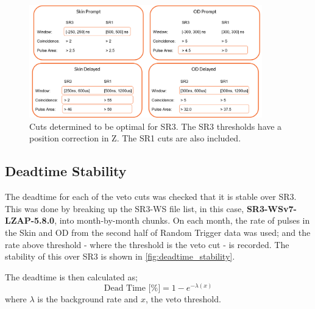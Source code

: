 \begin{figure}
    \centering
    \includegraphics[width=0.9\textwidth]{figures/VetoEfficiency/sr3_cuts.png}
    \caption{Cuts determined to be optimal for SR3. 
    The SR3 thresholds have a position correction in Z. The SR1 cuts are also included.}
    \label{fig:sr3_veto_cuts}
\end{figure}

\subsection{Deadtime Stability}

The deadtime for each of the veto cuts was checked that it is stable over SR3.
This was done by breaking up the SR3-WS file list, in this case, \textbf{SR3-WSv7-LZAP-5.8.0}, into month-by-month chunks.
On each month, the rate of pulses in the Skin and OD from the second half of Random Trigger data was used; and the rate above threshold - where the threshold is the veto cut - is recorded. The stability of this over SR3 is shown in \autoref{fig:deadtime_stability}.

The deadtime is then calculated as;
\begin{equation}
    \textrm{Dead Time [\%]} = 1 - e^{-\lambda (x)}
\end{equation}
where $\lambda$ is the background rate and $x$, the veto threshold.

